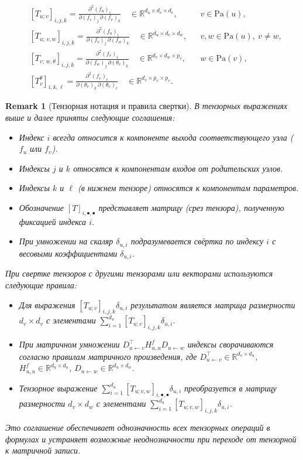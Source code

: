 \documentclass[11pt]{article}
\newtheorem{remark}{Remark}
\newcommand{\Pa}{\mathrm{Pa}} %
\begin{document}
\begin{align*}
  &[T_{u;v}]_{i,j,k}
  = \frac{\partial^2 (f_u)_i}{\partial(f_v)_j\,\partial(f_v)_k}
  \quad\in\mathbb{R}^{d_u\times d_v\times d_v},
  &&v\in\Pa(u),
  \\[3pt]
  &[T_{u;\,v,w}]_{i,j,k}
  = \frac{\partial^2 (f_u)_i}{\partial(f_v)_j\,\partial(f_w)_k}
  \quad\in\mathbb{R}^{d_u\times d_v\times d_w},
  &&v,w\in\Pa(u),\ v\neq w,
  \\[3pt]
  &[T_{v;\,w,\theta}]_{i,j,k}
  = \frac{\partial^2 (f_v)_i}{\partial(f_w)_j\,\partial(\theta_v)_k}
  \quad\in\mathbb{R}^{d_v\times d_w\times p_v},
  &&w\in\Pa(v),
  \\[3pt]
  &[T_v^\theta]_{i,k,\ell}
  = \frac{\partial^2 (f_v)_i}{\partial(\theta_v)_k\,\partial(\theta_v)_\ell}
  \quad\in\mathbb{R}^{d_v\times p_v\times p_v}.
\end{align*}

\begin{remark}[Тензорная нотация и правила свертки]
  В тензорных выражениях выше и далее приняты следующие соглашения:
  \begin{itemize}
    \item Индекс $i$ всегда относится к компоненте выхода соответствующего узла ($f_u$ или $f_v$).
    \item Индексы $j$ и $k$ относятся к компонентам входов от родительских узлов.
    \item Индексы $k$ и $\ell$ (в нижнем тензоре) относятся к компонентам параметров.
    \item Обозначение $[T]_{i,\bullet,\bullet}$ представляет матрицу (срез тензора), полученную фиксацией индекса $i$.
    \item При умножении на скаляр $\delta_{u,i}$ подразумевается свёртка по индексу $i$ с весовыми
      коэффициентами $\delta_{u,i}$.
  \end{itemize}

  При свертке тензоров с другими тензорами или векторами используются следующие правила:
  \begin{itemize}
    \item Для выражения $[T_{u;v}]_{i,j,k}\delta_{u,i}$ результатом является матрица размерности $d_v \times
      d_v$ с элементами $\sum_{i=1}^{d_u}[T_{u;v}]_{i,j,k}\delta_{u,i}$.
    \item При матричном умножении $D_{u\gets v}^\top H^f_{u,u} D_{u\gets w}$ индексы сворачиваются согласно
      правилам матричного произведения, где $D_{u\gets v}^\top \in \mathbb{R}^{d_v \times d_u}$, $H^f_{u,u}
      \in \mathbb{R}^{d_u \times d_u}$, $D_{u\gets w} \in \mathbb{R}^{d_u \times d_w}$.
    \item Тензорное выражение $\sum_{i=1}^{d_u}[T_{u;v,w}]_{i,\bullet,\bullet}\delta_{u,i}$ преобразуется в
      матрицу размерности $d_v \times d_w$ с элементами $\sum_{i=1}^{d_u}[T_{u;v,w}]_{i,j,k}\delta_{u,i}$.
  \end{itemize}

  Это соглашение обеспечивает однозначность всех тензорных операций в формулах и устраняет возможные
  неоднозначности при переходе от тензорной к матричной записи.
\end{remark}
\end{document}
